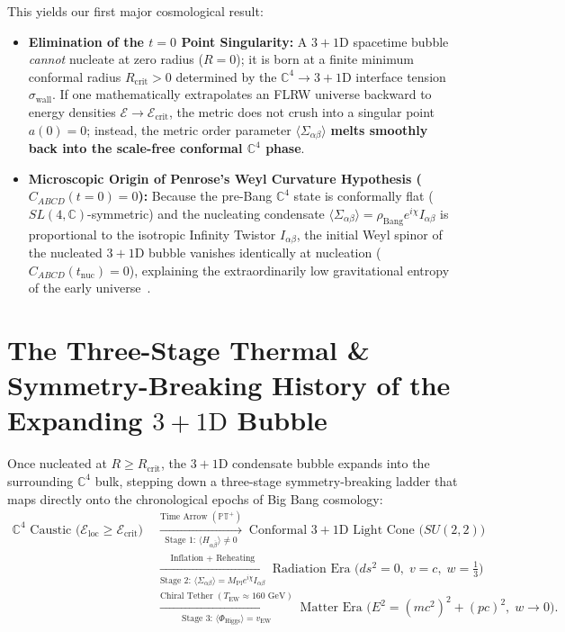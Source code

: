 \documentclass[11pt,a4paper]{article}
\begin{document}
This yields our first major cosmological result:
\begin{itemize}
    \item \textbf{Elimination of the $t = 0$ Point Singularity:} A $3+1\text{D}$ spacetime bubble \emph{cannot} nucleate at zero radius ($R = 0$); it is born at a finite minimum conformal radius $R_{\text{crit}} > 0$ determined by the $\mathbb{C}^4 \to 3+1\text{D}$ interface tension $\sigma_{\text{wall}}$. If one mathematically extrapolates an FLRW universe backward to energy densities $\mathcal{E} \to \mathcal{E}_{\text{crit}}$, the metric does not crush into a singular point $a(0) = 0$; instead, the metric order parameter $\langle\Sigma_{\alpha\beta}\rangle$ \textbf{melts smoothly back into the scale-free conformal $\mathbb{C}^4$ phase}.
    \item \textbf{Microscopic Origin of Penrose's Weyl Curvature Hypothesis ($C_{ABCD}(t=0) = 0$):} Because the pre-Bang $\mathbb{C}^4$ state is conformally flat ($SL(4,\mathbb{C})$-symmetric) and the nucleating condensate $\langle\Sigma_{\alpha\beta}\rangle = \rho_{\text{Bang}} e^{i\chi} I_{\alpha\beta}$ is proportional to the isotropic Infinity Twistor $I_{\alpha\beta}$, the initial Weyl spinor of the nucleated $3+1\text{D}$ bubble vanishes identically at nucleation ($C_{ABCD}(t_{\text{nuc}}) = 0$), explaining the extraordinarily low gravitational entropy of the early universe~\cite{PenroseCycles2010}.
\end{itemize}

\section{The Three-Stage Thermal \& Symmetry-Breaking History of the Expanding \texorpdfstring{$3+1\text{D}$}{3+1D} Bubble}

Once nucleated at $R \ge R_{\text{crit}}$, the $3+1\text{D}$ condensate bubble expands into the surrounding $\mathbb{C}^4$ bulk, stepping down a three-stage symmetry-breaking ladder that maps directly onto the chronological epochs of Big Bang cosmology:
\begin{equation}
\begin{aligned}
\mathbb{C}^4\text{ Caustic }\big(\mathcal{E}_{\text{loc}} \ge \mathcal{E}_{\text{crit}}\big) &\;\xrightarrow[\text{Stage 1: }\langle H_{\alpha\bar{\beta}}\rangle \neq 0]{\text{Time Arrow } (\mathbb{PT}^+)}\; \text{Conformal }3+1\text{D Light Cone }\big(SU(2,2)\big) \\
&\;\xrightarrow[\text{Stage 2: }\langle\Sigma_{\alpha\beta}\rangle = M_{\text{Pl}}e^{i\chi}I_{\alpha\beta}]{\text{Inflation + Reheating}}\; \text{Radiation Era }\big(ds^2 = 0,\; v = c,\; w = \tfrac{1}{3}\big) \\
&\;\xrightarrow[\text{Stage 3: }\langle\Phi_{\text{Higgs}}\rangle = v_{\text{EW}}]{\text{Chiral Tether }(T_{\text{EW}} \approx 160\text{ GeV})}\; \text{Matter Era }\big(E^2 = (mc^2)^2 + (pc)^2,\; w \to 0\big).
\end{aligned}
\end{equation}
\end{document}
